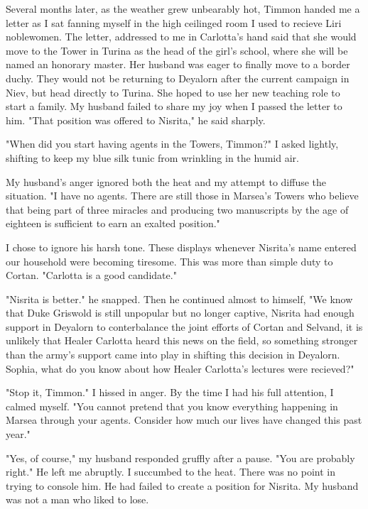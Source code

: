 \documentclass{article}
\begin{document}
\vspace{.5cm} 

Several months later, as the weather grew unbearably hot, Timmon handed me a letter as I sat fanning myself in the high ceilinged room I used to recieve Liri noblewomen. The letter, addressed to me in Carlotta's hand said that she would move to the Tower in Turina as the head of the girl's school, where she will be named an honorary master. Her husband was eager to finally move to a border duchy. They would not be returning to Deyalorn after the current campaign in Niev, but head directly to Turina. She hoped to use her new teaching role to start a family. My husband failed to share my joy when I passed the letter to him. "That position was offered to Nisrita," he said sharply.

"When did you start having agents in the Towers, Timmon?" I asked lightly, shifting to keep my blue silk tunic from wrinkling in the humid air.

My husband's anger ignored both the heat and my attempt to diffuse the situation. "I have no agents. There are still those in Marsea's Towers who believe that being part of three miracles and producing two manuscripts by the age of eighteen is sufficient to earn an exalted position."

I chose to ignore his harsh tone. These displays whenever Nisrita's name entered our household were becoming tiresome. This was more than simple duty to Cortan. "Carlotta is a good candidate."

"Nisrita is better." he snapped. Then he continued almost to himself, "We know that Duke Griswold is still unpopular but no longer captive, Nisrita had enough support in Deyalorn to conterbalance the joint efforts of Cortan and Selvand, it is unlikely that Healer Carlotta heard this news on the field, so something stronger than the army's support came into play in shifting this decision in Deyalorn. Sophia, what do you know about how Healer Carlotta's lectures were recieved?"

"Stop it, Timmon." I hissed in anger. By the time I had his full attention, I calmed myself. "You cannot pretend that you know everything happening in Marsea through your agents. Consider how much our lives have changed this past year."

"Yes, of course," my husband responded gruffly after a pause. "You are probably right." He left me abruptly. I succumbed to the heat. There was no point in trying to console him. He had failed to create a position for Nisrita. My husband was not a man who liked to lose.
\end{document}
